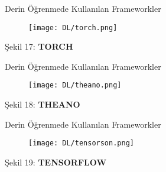 \documentclass{beamer}                                                                                          %
\begin{document}
    
    \begin{frame}{Derin Öğrenmede Kullanılan Frameworkler}
	    \begin{figure}
            \centering
            \texttt{[image: DL/torch.png]}
        \end{figure}
        \vspace{35} \centering
        \color{myred1}Şekil 17:\color{black} \textbf{TORCH}
    \end{frame}
    
    
    \begin{frame}{Derin Öğrenmede Kullanılan Frameworkler}
        \begin{figure}
            \texttt{[image: DL/theano.png]}
        \end{figure}
        \vspace{35} \centering
        \color{myred1}Şekil 18:\color{black} \textbf{THEANO}
	\end{frame}
	
    
    \begin{frame}{Derin Öğrenmede Kullanılan Frameworkler}
	    \begin{figure}
            \texttt{[image: DL/tensorson.png]}
        \end{figure}
        \newline \centering
        \color{myred1}Şekil 19:\color{black} \textbf{TENSORFLOW}
    \end{frame}
    
    
\end{document}
